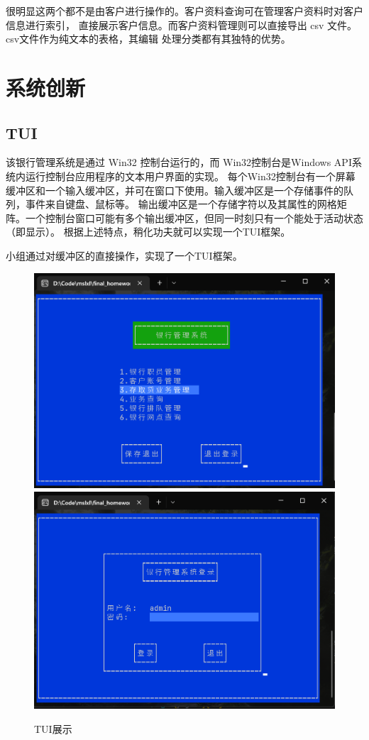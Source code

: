 \documentclass{ctexrep}
\begin{document}
很明显这两个都不是由客户进行操作的。客户资料查询可在管理客户资料时对客户信息进行索引，
直接展示客户信息。而客户资料管理则可以直接导出 csv 文件。csv文件作为纯文本的表格，其编辑
处理分类都有其独特的优势。

\chapter{系统创新}
\section{TUI}
该银行管理系统是通过 Win32 控制台运行的，而 Win32控制台是Windows API系统内运行控制台应用程序的文本用户界面的实现。
每个Win32控制台有一个屏幕缓冲区和一个输入缓冲区，并可在窗口下使用。输入缓冲区是一个存储事件的队列，事件来自键盘、鼠标等。
输出缓冲区是一个存储字符以及其属性的网格矩阵。一个控制台窗口可能有多个输出缓冲区，但同一时刻只有一个能处于活动状态（即显示）。
根据上述特点，稍化功夫就可以实现一个TUI框架。

小组通过对缓冲区的直接操作，实现了一个TUI框架。
\begin{figure}[!h]
  \centering
  \includegraphics[scale=0.45]{main_meun.png}
  \includegraphics[scale=0.45]{login.png}
  \caption{TUI展示}
\end{figure}
\end{document}

